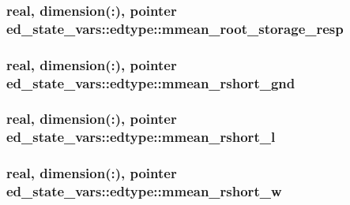 \subsubsection[{\texorpdfstring{mmean\+\_\+root\+\_\+storage\+\_\+resp}{mmean_root_storage_resp}}]{\setlength{\rightskip}{0pt plus 5cm}real, dimension(\+:), pointer ed\+\_\+state\+\_\+vars\+::edtype\+::mmean\+\_\+root\+\_\+storage\+\_\+resp}\hypertarget{structed__state__vars_1_1edtype_adee80817146942be0185b4237329cccf}{}\label{structed__state__vars_1_1edtype_adee80817146942be0185b4237329cccf}
\subsubsection[{\texorpdfstring{mmean\+\_\+rshort\+\_\+gnd}{mmean_rshort_gnd}}]{\setlength{\rightskip}{0pt plus 5cm}real, dimension(\+:), pointer ed\+\_\+state\+\_\+vars\+::edtype\+::mmean\+\_\+rshort\+\_\+gnd}\hypertarget{structed__state__vars_1_1edtype_aff5e202b683fa4f2e53bec9ca5aff164}{}\label{structed__state__vars_1_1edtype_aff5e202b683fa4f2e53bec9ca5aff164}
\subsubsection[{\texorpdfstring{mmean\+\_\+rshort\+\_\+l}{mmean_rshort_l}}]{\setlength{\rightskip}{0pt plus 5cm}real, dimension(\+:), pointer ed\+\_\+state\+\_\+vars\+::edtype\+::mmean\+\_\+rshort\+\_\+l}\hypertarget{structed__state__vars_1_1edtype_acd90df150515e79fd8d793485d365358}{}\label{structed__state__vars_1_1edtype_acd90df150515e79fd8d793485d365358}
\subsubsection[{\texorpdfstring{mmean\+\_\+rshort\+\_\+w}{mmean_rshort_w}}]{\setlength{\rightskip}{0pt plus 5cm}real, dimension(\+:), pointer ed\+\_\+state\+\_\+vars\+::edtype\+::mmean\+\_\+rshort\+\_\+w}\hypertarget{structed__state__vars_1_1edtype_a492246b2c17eff0a9da8074a544125ff}{}\label{structed__state__vars_1_1edtype_a492246b2c17eff0a9da8074a544125ff}
